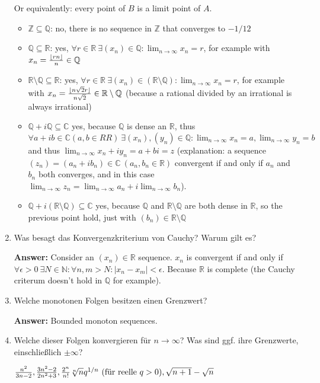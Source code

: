 \documentclass[11pt]{article}
\newcommand{\abs}[1]{\left|#1\right|}
\newcommand{\RR}[0]{\mathbb{R}}
\newcommand{\CC}[0]{\mathbb{C}}
\newcommand{\QQ}[0]{\mathbb{Q}}
\newcommand{\ZZ}[0]{\mathbb{Z}}
\newcommand{\NN}[0]{\mathbb{N}}
\DeclarePairedDelimiter\floor{\lfloor}{\rfloor}
\begin{document}
\begin{enumerate}
    Or equivalently: every point of $B$ is a limit point of $A$.
    \begin{itemize}
        \item $\ZZ \subseteq \QQ$: no, there is no sequence in $\ZZ$ that converges to $-1/12$
        \item $\QQ \subseteq \RR$: yes, $\forall r\in \RR~\exists(x_n)\in \QQ\colon \lim_{n\to\infty}x_n = r$, for example with $x_n = \frac{\floor{r n}}{n} \in \QQ$
        \item $\RR \setminus \QQ \subseteq \RR$: yes, $\forall r\in\RR~\exists(x_n) \in (\RR \setminus \QQ)\colon \lim_{n\to\infty} x_n = r$, for example with $x_n = \frac{\floor{n \sqrt{2} r}}{n \sqrt{2}} \in \RR \setminus \QQ$ (because a rational divided by an irrational is always irrational)
        \item $\QQ + i\QQ \subseteq \CC$ yes, because $\QQ$ is dense an $\RR$, thus $\forall a + ib \in \CC (a, b \in RR)~\exists (x_n), (y_n) \in \QQ\colon \lim_{n\to\infty} x_n = a, \lim_{n\to\infty} y_n = b$ and thus $\lim_{n\to\infty} x_n + i y_n = a + b i = z$ (explanation: a sequence $(z_n) = (a_n + i b_n) \in \CC~(a_n, b_n \in \RR)$ convergent if and only if $a_n$ and $b_n$ both converges, and in this case $\lim_{n\to\infty} z_n = \lim_{n\to\infty} a_n + i\lim_{n\to\infty}b_n$).
        \item $\QQ + i(\RR\setminus\QQ) \subseteq \CC$ yes, because $\QQ$ and $\RR \setminus \QQ$ are both dense in $\RR$, so the previous point hold, just with $(b_n) \in \RR\setminus\QQ$
    \end{itemize}
    \item Was besagt das Konvergenzkriterium von Cauchy? Warum gilt es?

    \textbf{Answer:} Consider an $(x_n) \in \RR$ sequence. $x_n$ is convergent if and only if $\forall \epsilon > 0~\exists N \in \NN\colon \forall n, m > N\colon \abs{x_n - x_m} < \epsilon$. Because $\RR$ is complete (the Cauchy criterum doesn't hold in $\QQ$ for example).

    \item Welche monotonen Folgen besitzen einen Grenzwert?

    \textbf{Answer:} Bounded monoton sequences.

    \item Welche dieser Folgen konvergieren für $n \to \infty$? Was sind ggf. ihre Grenzwerte, einschließlich $\pm \infty$?

    \hspace*{\fill}
    $\frac{n^2}{3n - 2}, \hfill \frac{3n^2 - 2}{2n^2+3},\hfill \frac{2^n}{n!} \hfill \sqrt[n]{n} \hfill q^{1/n}~(\text{für reelle }q > 0), \hfill \sqrt{n+1} - \sqrt{n}\hfill$
    \hspace*{\fill}


\end{enumerate}
\end{document}
